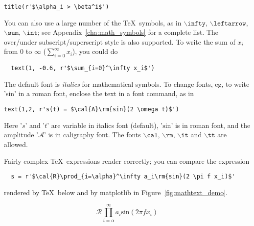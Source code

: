 \documentclass[twoside]{book}
\begin{document}
\begin{lstlisting}
title(r'$\alpha_i > \beta^i$')
\end{lstlisting}


You can also use a large number of the \TeX\ symbols, as in
$\mathtt{\backslash infty}$, $\mathtt{\backslash leftarrow}$,
$\mathtt{\backslash sum}$, $\mathtt{\backslash int}$; see
Appendix~\ref{cha:math_symbols} for a complete list.  The over/under
subscript/superscript style is also supported.  To write the sum of
$x_i$ from 0 to $\infty$ ($\sum_{i=0}^\infty x_i$), you could do 

\begin{lstlisting}
  text(1, -0.6, r'$\sum_{i=0}^\infty x_i$')
\end{lstlisting}

The default font is \textit{italics} for mathematical symbols.  To
change fonts, eg, to write 'sin' in a \textrm{roman font}, enclose the
text in a font command, as in

\begin{lstlisting}
text(1,2, r's(t) = $\cal{A}\rm{sin}(2 \omega t)$')
\end{lstlisting}

\noindent Here '$s$' and '$t$' are variable in italics font (default),
'$\mathrm{sin}$' is in roman font, and the amplitude '$\mathcal{A}$'
is in caligraphy font.  The fonts $\mathtt{\backslash cal}$,
$\mathtt{\backslash rm}$, $\mathtt{\backslash it}$ and
$\mathtt{\backslash tt}$ are allowed.

Fairly complex \TeX\ expressions render correctly; you can compare the
expression

\begin{verbatim}
  s = r'$\cal{R}\prod_{i=\alpha}^\infty a_i\rm{sin}(2 \pi f x_i)$'
\end{verbatim}

\noindent rendered by \TeX\ below and by matplotlib in
Figure~\ref{fig:mathtext_demo}.

\begin{equation}
    \mathcal{R}\prod_{i=\alpha}^\infty a_i\mathrm{sin}(2 \pi f x_i)
\end{equation}



\end{document}
